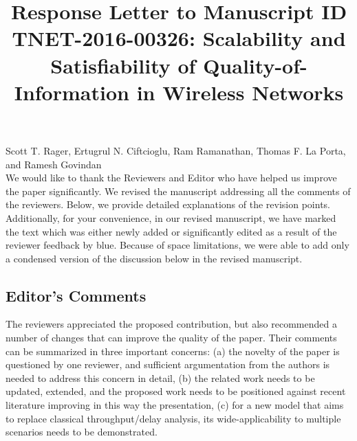 \documentclass[12pt, letterpaper, onecolumn]{IEEEtran}
\title{Response Letter to Manuscript ID TNET-2016-00326: Scalability and Satisfiability of Quality-of-Information in Wireless Networks}
\begin{document}
\maketitle
{\Large{Scott T. Rager, 
Ertugrul N. Ciftcioglu,
Ram Ramanathan,
Thomas F. La Porta, and
Ramesh Govindan}}\\


{ \color {blue}We would like to thank the Reviewers and Editor who have helped us improve the paper significantly. We revised the manuscript addressing all the comments of the reviewers. Below, we provide detailed explanations of the revision points. Additionally, for your convenience, in our revised manuscript, we have marked the text which was either newly added or significantly edited as a result of the reviewer feedback by blue. Because of space limitations, we were able to add only a condensed version of the discussion below in the revised manuscript. }\\

\subsection {Editor's Comments}
The reviewers appreciated the proposed contribution, but also recommended a number of changes that can improve the quality of the paper. Their comments can be summarized in three important concerns: (a) the novelty of the paper is questioned by one reviewer, and sufficient argumentation from the authors is needed to address this concern in detail, (b) the related work needs to be updated, extended, and the proposed work needs to be positioned against recent literature improving in this way the presentation, (c) for a new model that aims to replace classical throughput/delay analysis, its wide-applicability to multiple scenarios needs to be demonstrated. 
\end{document}

